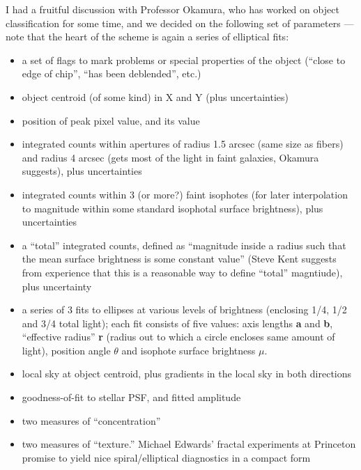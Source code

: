   I had a fruitful discussion with Professor Okamura, who has worked on
object classification for some time, and we decided on the following 
set of parameters --- note that the heart of the scheme is again
a series of elliptical fits:

\begin {itemize}
   \item a set of flags to mark problems or special properties of the
            object (``close to edge of chip'', ``has been deblended'', etc.)
   \item object centroid (of some kind) in X and Y (plus uncertainties)
   \item position of peak pixel value, and its value
   \item integrated counts within apertures of radius 1.5 arcsec (same
            size as fibers) and radius 4 arcsec (gets most of the light
            in faint galaxies, Okamura suggests), plus uncertainties
   \item integrated counts within 3 (or more?) faint isophotes (for later
            interpolation to magnitude within some standard
            isophotal surface brightness), plus uncertainties
   \item a ``total'' integrated counts, defined as ``magnitude inside
            a radius such that the mean surface brightness is some
            constant value'' (Steve Kent suggests from experience that
            this is a reasonable way to define ``total'' magntiude),
            plus uncertainty
   \item a series of 3 fits to ellipses at various levels
            of brightness (enclosing 1/4, 1/2 and 3/4 total light); 
            each fit consists of five values:
            axis lengths {\bf a} and {\bf b}, ``effective radius'' {\bf r}
            (radius out to which a circle encloses same amount of light),
            position angle {\bf $\theta$}
            and isophote surface brightness {\bf $\mu$}.
   \item local sky at object centroid, plus gradients in the local 
            sky in both directions
   \item goodness-of-fit to stellar PSF, and fitted amplitude
   \item two measures of ``concentration'' 
   \item two measures of ``texture.'' Michael Edwards' fractal experiments
            at Princeton promise to yield nice spiral/elliptical diagnostics
            in a compact form
\end {itemize}

